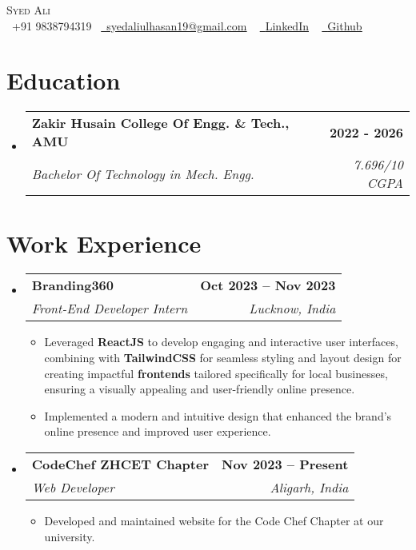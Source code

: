 \documentclass[letterpaper,11pt]{article}
\makeatletter
\newcommand{\resumeItem}[1]{
  \item\small{
    {#1 \vspace{-2pt}}
  }
}
\newcommand{\resumeSubheading}[4]{
  \vspace{-2pt}\item
    \begin{tabular*}{1.0\textwidth}[t]{l@{\extracolsep{\fill}}r}
      \textbf{#1} & \textbf{\small #2} \\
      \textit{\small#3} & \textit{\small #4} \\
    \end{tabular*}\vspace{-7pt}
}
\newcommand{\resumeSubHeadingListStart}{\begin{itemize}[leftmargin=0.0in, label={}]}
\newcommand{\resumeSubHeadingListEnd}{\end{itemize}}
\newcommand{\resumeItemListStart}{\begin{itemize}}
\newcommand{\resumeItemListEnd}{\end{itemize}\vspace{-5pt}}
\makeatother
\begin{document}
\begin{center}
  {\Huge \scshape Syed Ali} \\ \vspace{5pt}
  \small \raisebox{-0.1\height}\faPhone\ +91 9838794319~ \href{mailto:syedaliulhasan19@gmail.com}{\raisebox{-0.2\height}\faEnvelope\  \underline{syedaliulhasan19@gmail.com}} ~
  \href{www.linkedin.com/in/syedali237}{\raisebox{-0.2\height}\faLinkedin\ \underline{LinkedIn}}  ~
  \href{https://github.com/syedali237}{\raisebox{-0.2\height}\faGithub\ \underline{Github}}
  \vspace{-8pt}
\end{center}

\vspace{-12pt}
\section{Education}
\resumeSubHeadingListStart
\resumeSubheading
{Zakir Husain College Of Engg. \& Tech., AMU}{2022 - 2026}{Bachelor Of Technology in Mech. Engg.}{7.696/10 CGPA}
\resumeSubHeadingListEnd
\vspace{-9pt}



\section{Work Experience}
\resumeSubHeadingListStart

\resumeSubheading
{Branding360}{Oct 2023 -- Nov 2023}
{Front-End Developer Intern}{Lucknow, India}
\resumeItemListStart
\resumeItem{Leveraged \textbf{ReactJS} to develop engaging and interactive user interfaces, combining with \textbf{TailwindCSS} for seamless styling and layout design for creating impactful \textbf{frontends} tailored specifically for local businesses, ensuring a
visually appealing and user-friendly online presence.}
\resumeItem{Implemented a modern and intuitive design that enhanced the brand's online presence and improved user experience.}
\resumeItemListEnd
\resumeSubheading
{CodeChef ZHCET Chapter}{Nov 2023 -- Present}
{Web Developer}{Aligarh, India}
\resumeItemListStart
\resumeItem{Developed and maintained website for the Code Chef Chapter at our university.}
\resumeItemListEnd
\resumeSubHeadingListEnd
\vspace{-13pt}



\end{document}
